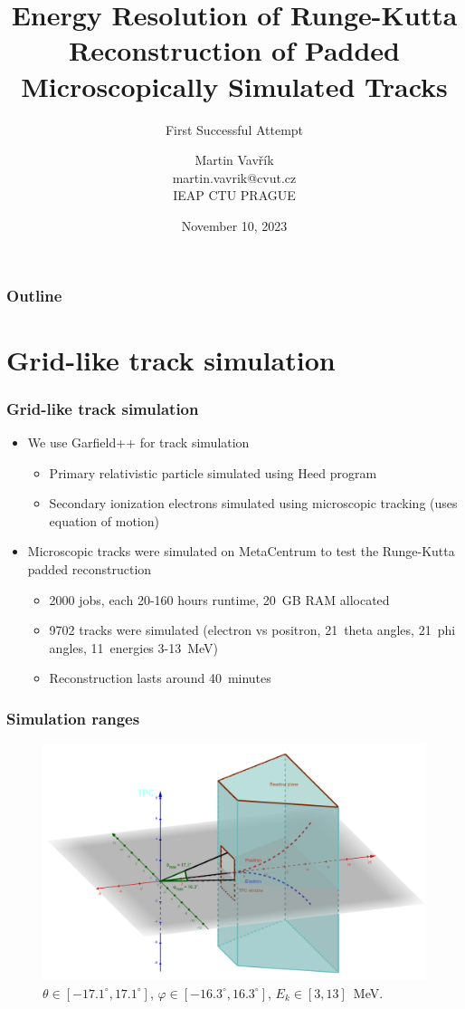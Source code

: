 \documentclass{beamer}
\title[Runge-Kutta Algorithm Energy Resolution]{Energy Resolution of Runge-Kutta Reconstruction of Padded Microscopically Simulated Tracks}
\subtitle{First Successful Attempt}
\author[M.~Vavřík]{\foreignlanguage{czech}{Martin Vavřík}\vspace{0.5cm}\\martin.vavrik@cvut.cz\\IEAP CTU PRAGUE\\}
\date{November 10, 2023}
\begin{document}
	
	\begin{frame}
		\titlepage
	\end{frame}
	
	\begin{frame}
		\frametitle{Outline}
		\tableofcontents
	\end{frame}
	
	\section{Grid-like track simulation}
		\begin{frame}
			\frametitle{Grid-like track simulation}
			\begin{itemize}
				\item We use Garfield++ for track simulation
				\begin{itemize}
					\item Primary relativistic particle simulated using Heed program~\cite{heed}
					\item Secondary ionization electrons simulated using microscopic tracking (uses equation of motion)
				\end{itemize}
				\item Microscopic tracks were simulated on MetaCentrum to test the Runge-Kutta padded reconstruction
				\begin{itemize}
					\item 2000 jobs, each 20-160 hours runtime, 20~GB RAM allocated
					\item 9702 tracks were simulated (electron vs positron, 21~theta angles, 21~phi angles, 11~energies 3-13~MeV)
					\item Reconstruction lasts around 40~minutes
				\end{itemize}
			\end{itemize}
		\end{frame}
		
		\begin{frame}
		\frametitle{Simulation ranges}
			\begin{figure}
				\centering
				\includegraphics[width = 0.9 \linewidth]{../images/tpc_micro_simulation.png}
				\caption{$\theta \in [-17.1^\circ,17.1^\circ]$, $\varphi \in [-16.3^\circ,16.3^\circ]$, $ E_k \in [3,13] $~MeV.}
			\end{figure}
		\end{frame}
	
\end{document}
